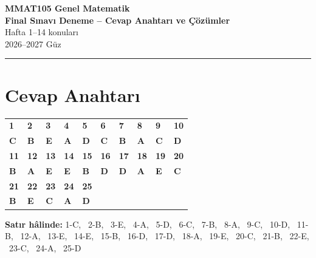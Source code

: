\documentclass[11pt,a4paper]{article}
\begin{document}
\begin{minipage}[c]{\textwidth}
{\LARGE\bfseries\color{anamavi} MMAT105 Genel Matematik}\\[4pt]
{\large\bfseries Final Sınavı Deneme -- Cevap Anahtarı ve Çözümler}\\[2pt]
{\normalsize Hafta 1--14 konuları}\\[6pt]
{\small 2026--2027 Güz}
\end{minipage}

\vspace{4pt}\noindent\textcolor{anamavi}{\rule{\textwidth}{1pt}}

\section*{Cevap Anahtarı}
\begin{center}
\renewcommand{\arraystretch}{1.5}
\begin{tabular}{|>{\centering\arraybackslash}p{1.1cm}|>{\centering\arraybackslash}p{1.1cm}|>{\centering\arraybackslash}p{1.1cm}|>{\centering\arraybackslash}p{1.1cm}|>{\centering\arraybackslash}p{1.1cm}|>{\centering\arraybackslash}p{1.1cm}|>{\centering\arraybackslash}p{1.1cm}|>{\centering\arraybackslash}p{1.1cm}|>{\centering\arraybackslash}p{1.1cm}|>{\centering\arraybackslash}p{1.1cm}|}\hline
\textbf{1} & \textbf{2} & \textbf{3} & \textbf{4} & \textbf{5} & \textbf{6} & \textbf{7} & \textbf{8} & \textbf{9} & \textbf{10}\\
\textbf{\color{cozumyesil}C} & \textbf{\color{cozumyesil}B} & \textbf{\color{cozumyesil}E} & \textbf{\color{cozumyesil}A} & \textbf{\color{cozumyesil}D} & \textbf{\color{cozumyesil}C} & \textbf{\color{cozumyesil}B} & \textbf{\color{cozumyesil}A} & \textbf{\color{cozumyesil}C} & \textbf{\color{cozumyesil}D}\\\hline
\textbf{11} & \textbf{12} & \textbf{13} & \textbf{14} & \textbf{15} & \textbf{16} & \textbf{17} & \textbf{18} & \textbf{19} & \textbf{20}\\
\textbf{\color{cozumyesil}B} & \textbf{\color{cozumyesil}A} & \textbf{\color{cozumyesil}E} & \textbf{\color{cozumyesil}E} & \textbf{\color{cozumyesil}B} & \textbf{\color{cozumyesil}D} & \textbf{\color{cozumyesil}D} & \textbf{\color{cozumyesil}A} & \textbf{\color{cozumyesil}E} & \textbf{\color{cozumyesil}C}\\\hline
\textbf{21} & \textbf{22} & \textbf{23} & \textbf{24} & \textbf{25} &  &  &  &  & \\
\textbf{\color{cozumyesil}B} & \textbf{\color{cozumyesil}E} & \textbf{\color{cozumyesil}C} & \textbf{\color{cozumyesil}A} & \textbf{\color{cozumyesil}D} &  &  &  &  & \\\hline
\end{tabular}
\end{center}
{\small\textbf{Satır hâlinde:} 1-C, \ 2-B, \ 3-E, \ 4-A, \ 5-D, \ 6-C, \ 7-B, \ 8-A, \ 9-C, \ 10-D, \ 11-B, \ 12-A, \ 13-E, \ 14-E, \ 15-B, \ 16-D, \ 17-D, \ 18-A, \ 19-E, \ 20-C, \ 21-B, \ 22-E, \ 23-C, \ 24-A, \ 25-D}
\end{document}
